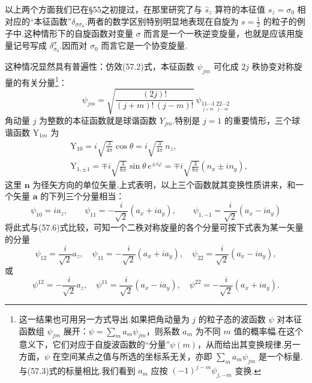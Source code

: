以上两个方面我们已在§55之初提过，在那里研究了与 $\hat{s}_z$ 算符的本征值 $s_z=\sigma_0$ 相对应的“本征函数”$\delta_{\sigma\sigma_0}$.两者的数学区别特别明显地表现在自旋为 $s=\frac{1}{2}$ 的粒子的例子中.这种情形下的自旋函数对变量 $\sigma$ 而言是一个一秩逆变旋量，也就是应该用旋量记号写成 $\delta^{\sigma}_{\sigma_0}$.因而对 $\sigma_0$ 而言它是一个协变旋量.

这种情况显然具有普遍性：仿效(57.2)式，本征函数 $\psi_{jm}$ 可化成 $2j$ 秩协变对称旋量的有关分量\footnote{这一结果也可用另一方式导出.如果把角动量为 $j$ 的粒子态的波函数 $\psi$ 对本征函数组 $\psi_{jm}$ 展开：$\psi=\sum\limits_m a_m\psi_{jm}$，则系数 $a_m$ 为不同 $m$ 值的概率幅.在这个意义下，它们对应于自旋波函数的“分量”$\psi(m)$，从而给出其变换规律.另一方面，$\psi$ 在空间某点之值与所选的坐标系无关，亦即 $\sum\limits_m a_m\psi_{jm}$ 是一个标量.与(57.3)式的标量相比.我们看到 $a_m$ 应按 $(-1)^{j-m}\psi_{j,-m}$ 变换.}：
\begin{equation}
  \psi_{jm}=\sqrt{\frac{(2j)!}{(j+m)!\,(j-m)!}}\,
  \psi_{\underset{j+m}{11\cdots1}\ \underset{j-m}{22\cdots2}}
\end{equation}
角动量 $j$ 为整数的本征函数就是球谐函数 $Y_{jm}$.特别是 $j=1$ 的重要情形，三个球谐函数 $\mathrm{Y}_{1m}$ 为
\begin{equation*}
\begin{aligned}
  &\mathrm{Y}_{10}=i\sqrt{\frac{3}{4\pi}}\cos\theta
  =i\sqrt{\frac{3}{4\pi}}\,n_z,\\
  &\mathrm{Y}_{1,\pm1}=\mp i\sqrt{\frac{3}{8\pi}}\sin\theta\,e^{\pm i\varphi}
  =\mp i\sqrt{\frac{3}{8\pi}}\left(n_x\pm in_y\right),
\end{aligned}
\end{equation*}
这里 $\boldsymbol{n}$ 为径矢方向的单位矢量.上式表明，以上三个函数就其变换性质讲来，和一个矢量 $\boldsymbol{a}$ 的下列三个分量相当：
\begin{equation}
  \psi_{10}=ia_z,\qquad
  \psi_{11}=-\frac{i}{\sqrt{2}}(a_x+ia_y),\qquad
  \psi_{1,-1}=\frac{i}{\sqrt{2}}(a_x-ia_y)
\end{equation}
将此式与(57.6)式比较，可知一个二秩对称旋量的各个分量可按下式表为某一矢量的分量
\begin{equation}
  \psi_{12}=\frac{i}{\sqrt{2}}a_z,\quad
  \psi_{11}=-\frac{i}{\sqrt{2}}(a_x+ia_y),\quad
  \psi_{22}=\frac{i}{\sqrt{2}}(a_x-ia_y),
\end{equation}
或
\begin{equation}
  \psi^{12}=-\frac{i}{\sqrt{2}}a_z,\quad
  \psi^{11}=\frac{i}{\sqrt{2}}(a_x-ia_y),\quad
  \psi^{22}=-\frac{i}{\sqrt{2}}(a_x+ia_y).
\end{equation}
